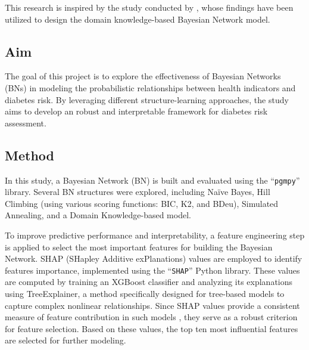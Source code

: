 \documentclass[letterpaper]{article}
\begin{document}
This research is inspired by the study conducted by \citet{kong2024}, whose findings have been utilized to design the domain knowledge-based Bayesian Network model.

\subsection{Aim}

The goal of this project is to explore the effectiveness of Bayesian Networks (BNs) in modeling the probabilistic relationships between health indicators and diabetes risk. By leveraging different structure-learning approaches, the study aims to develop an robust and interpretable framework for diabetes risk assessment.

\subsection{Method} 

In this study, a Bayesian Network (BN) is built and evaluated using the ``\texttt{pgmpy}'' library. Several BN structures were explored, including Naïve Bayes, Hill Climbing (using various scoring functions: BIC, K2, and BDeu), Simulated Annealing, and a Domain Knowledge-based model.  


To improve predictive performance and interpretability, a feature engineering step is applied to select the most important features for building the Bayesian Network. SHAP (SHapley Additive exPlanations) values are employed to identify features importance, implemented using the ``\texttt{SHAP}'' Python library. These values are computed by training an XGBoost classifier \citep{XGBoost} and analyzing its explanations using TreeExplainer, a method specifically designed for tree-based models to capture complex nonlinear relationships. Since SHAP values provide a consistent measure of feature contribution in such models \citep{SHAP}, they serve as a robust criterion for feature selection. Based on these values, the top ten most influential features are selected for further modeling.
\end{document}
